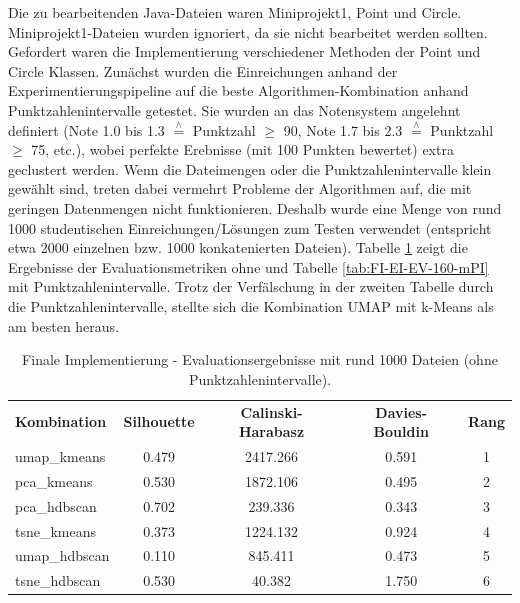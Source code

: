 Die zu bearbeitenden Java-Dateien waren Miniprojekt1, Point und Circle. Miniprojekt1-Dateien wurden ignoriert, da sie nicht bearbeitet werden sollten. Gefordert waren die Implementierung verschiedener Methoden der Point und Circle Klassen. Zunächst wurden die Einreichungen anhand der Experimentierungspipeline auf die beste Algorithmen-Kombination anhand Punktzahlenintervalle getestet. Sie wurden an das Notensystem angelehnt definiert (Note 1.0 bis 1.3 $\overset{\wedge}{=}$ Punktzahl $\geq$ 90, Note 1.7 bis 2.3 $\overset{\wedge}{=}$ Punktzahl $\geq$ 75, etc.), wobei perfekte Erebnisse (mit 100 Punkten bewertet) extra geclustert werden. Wenn die Dateimengen oder die Punktzahlenintervalle klein gewählt sind, treten dabei vermehrt Probleme der Algorithmen auf, die mit geringen Datenmengen nicht funktionieren. Deshalb wurde eine Menge von rund 1000 studentischen Einreichungen/Lösungen zum Testen verwendet (entspricht etwa 2000 einzelnen bzw. 1000 konkatenierten Dateien). Tabelle \ref{tab:FI-EI-EV-160-oPI} zeigt die Ergebnisse der Evaluationsmetriken ohne und Tabelle \ref{tab:FI-EI-EV-160-mPI} mit Punktzahlenintervalle. Trotz der Verfälschung in der zweiten Tabelle durch die Punktzahlenintervalle, stellte sich die Kombination UMAP mit k-Means als am besten heraus.

\setlength{\tabcolsep}{5.5pt}
\begin{table}[h]
\centering
\begin{tabular}{lcccc}
\hline
\textbf{Kombination} & \textbf{Silhouette} & \textbf{Calinski-Harabasz} & \textbf{Davies-Bouldin} & \textbf{Rang} \\
umap\_kmeans    & 0.479 & 2417.266 & 0.591 & 1 \\
pca\_kmeans     & 0.530 & 1872.106 & 0.495 & 2 \\
pca\_hdbscan    & 0.702 & 239.336  & 0.343 & 3 \\
tsne\_kmeans    & 0.373 & 1224.132 & 0.924 & 4 \\
umap\_hdbscan   & 0.110 & 845.411  & 0.473 & 5 \\
tsne\_hdbscan   & 0.530 & 40.382   & 1.750 & 6 \\
\hline
\end{tabular}
\caption{Finale Implementierung - Evaluationsergebnisse mit rund 1000 Dateien (ohne Punktzahlenintervalle).}
\label{tab:FI-EI-EV-160-oPI}
\end{table}

